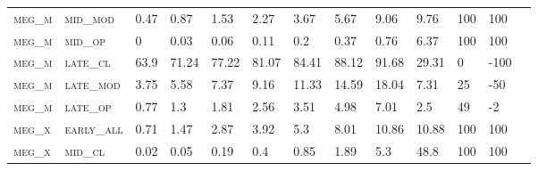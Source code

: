 \begin{sidewaystable}[!htbp]
\begin{tabular}{@{}lllllllllllll@{}}
\footnotesize \textsc{meg\_m}      & \footnotesize \textsc{mid\_mod  }                & \footnotesize 0.47            & \footnotesize 0.87            & \footnotesize 1.53             & \footnotesize 2.27             & \footnotesize 3.67             & \footnotesize 5.67             & \footnotesize 9.06       & \footnotesize 9.76     & \footnotesize 100    & \footnotesize 100      \\
\footnotesize \textsc{meg\_m}      & \footnotesize \textsc{mid\_op   }                & \footnotesize 0               & \footnotesize 0.03            & \footnotesize 0.06             & \footnotesize 0.11             & \footnotesize 0.2              & \footnotesize 0.37             & \footnotesize 0.76       & \footnotesize 6.37     & \footnotesize 100    & \footnotesize 100      \\
\footnotesize \textsc{meg\_m}      & \footnotesize \textsc{late\_cl  }                & \footnotesize 63.9            & \footnotesize 71.24           & \footnotesize 77.22            & \footnotesize 81.07            & \footnotesize 84.41            & \footnotesize 88.12            & \footnotesize 91.68      & \footnotesize 29.31    & \footnotesize 0      & \footnotesize -100     \\
\footnotesize \textsc{meg\_m}      & \footnotesize \textsc{late\_mod }                & \footnotesize 3.75            & \footnotesize 5.58            & \footnotesize 7.37             & \footnotesize 9.16             & \footnotesize 11.33            & \footnotesize 14.59            & \footnotesize 18.04      & \footnotesize 7.31     & \footnotesize 25     & \footnotesize -50      \\
\footnotesize \textsc{meg\_m}      & \footnotesize \textsc{late\_op  }                & \footnotesize 0.77            & \footnotesize 1.3             & \footnotesize 1.81             & \footnotesize 2.56             & \footnotesize 3.51             & \footnotesize 4.98             & \footnotesize 7.01       & \footnotesize 2.5      & \footnotesize 49     & \footnotesize -2       \\
\footnotesize \textsc{meg\_x}      & \footnotesize \textsc{early\_all}                & \footnotesize 0.71            & \footnotesize 1.47            & \footnotesize 2.87             & \footnotesize 3.92             & \footnotesize 5.3              & \footnotesize 8.01             & \footnotesize 10.86      & \footnotesize 10.88    & \footnotesize 100    & \footnotesize 100      \\
\footnotesize \textsc{meg\_x}      & \footnotesize \textsc{mid\_cl   }                & \footnotesize 0.02            & \footnotesize 0.05            & \footnotesize 0.19             & \footnotesize 0.4              & \footnotesize 0.85             & \footnotesize 1.89             & \footnotesize 5.3        & \footnotesize 48.8     & \footnotesize 100    & \footnotesize 100      \\

\end{tabular}
\end{sidewaystable}
